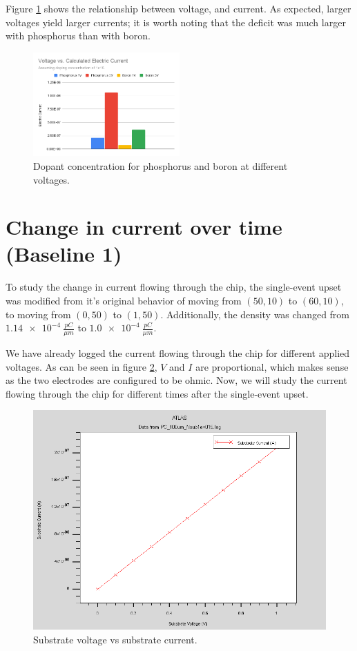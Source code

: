 \documentclass[12pt]{article}
\begin{document}
Figure \ref{fig:voltvcurrent} shows the relationship between voltage, and current. As expected, larger voltages yield larger currents; it is worth noting that the deficit was much larger with phosphorus than with boron.

\begin{figure}[H]
  \centering
  \includegraphics[width=0.5\textwidth]{voltvcurrent}
  \caption{Dopant concentration for phosphorus and boron at different voltages.}
  \label{fig:voltvcurrent}
\end{figure}

\section{Change in current over time (Baseline 1)}

To study the change in current flowing through the chip, the single-event upset was modified from it's original behavior of moving from $(50, 10)$ to $(60, 10)$, to moving from $(0, 50)$ to $(1, 50)$. Additionally, the density was changed from $\SI{1.14e-4}{\frac{pC}{{\mu}m}}$ to $\SI{1.0e-4}{\frac{pC}{{\mu}m}}$.

We have already logged the current flowing through the chip for different applied voltages. As can be seen in figure \ref{fig:voltvcurrentlog}, $V$ and $I$ are proportional, which makes sense as the two electrodes are configured to be ohmic. Now, we will study the current flowing through the chip for different times after the single-event upset.

\begin{figure}[H]
  \centering
  \includegraphics[width=\textwidth]{voltvcurrentlog}
  \caption{Substrate voltage vs substrate current.}
  \label{fig:voltvcurrentlog}
\end{figure}
\end{document}

